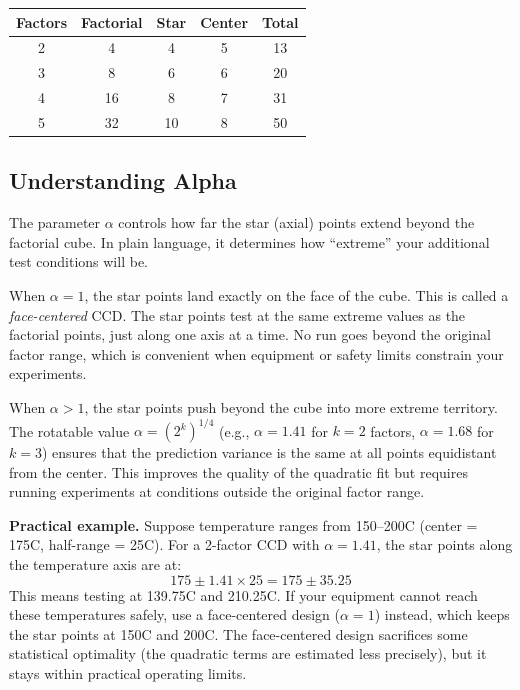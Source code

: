 \documentclass[11pt]{book}
\begin{document}
\begin{center}
\begin{tabular}{ccccc}
\toprule
Factors & Factorial & Star & Center & Total \\
\midrule
2 & 4 & 4 & 5 & 13 \\
3 & 8 & 6 & 6 & 20 \\
4 & 16 & 8 & 7 & 31 \\
5 & 32 & 10 & 8 & 50 \\
\bottomrule
\end{tabular}
\end{center}

\subsection{Understanding Alpha}

The parameter $\alpha$ controls how far the star (axial) points extend beyond
the factorial cube. In plain language, it determines how ``extreme'' your
additional test conditions will be.

When $\alpha = 1$, the star points land exactly on the face of the cube. This
is called a \emph{face-centered} CCD. The star points test at the same extreme
values as the factorial points, just along one axis at a time. No run goes
beyond the original factor range, which is convenient when equipment or safety
limits constrain your experiments.

When $\alpha > 1$, the star points push beyond the cube into more extreme
territory. The rotatable value $\alpha = (2^k)^{1/4}$ (e.g., $\alpha = 1.41$
for $k = 2$ factors, $\alpha = 1.68$ for $k = 3$) ensures that the prediction
variance is the same at all points equidistant from the center. This improves
the quality of the quadratic fit but requires running experiments at conditions
outside the original factor range.

\medskip
\noindent\textbf{Practical example.}
Suppose temperature ranges from 150--200\textdegree C (center = 175\textdegree C,
half-range = 25\textdegree C). For a 2-factor CCD with $\alpha = 1.41$, the
star points along the temperature axis are at:
\[
175 \pm 1.41 \times 25 = 175 \pm 35.25
\]
This means testing at 139.75\textdegree C and 210.25\textdegree C. If your
equipment cannot reach these temperatures safely, use a face-centered design
($\alpha = 1$) instead, which keeps the star points at 150\textdegree C and
200\textdegree C. The face-centered design sacrifices some statistical
optimality (the quadratic terms are estimated less precisely), but it stays
within practical operating limits.
\end{document}
